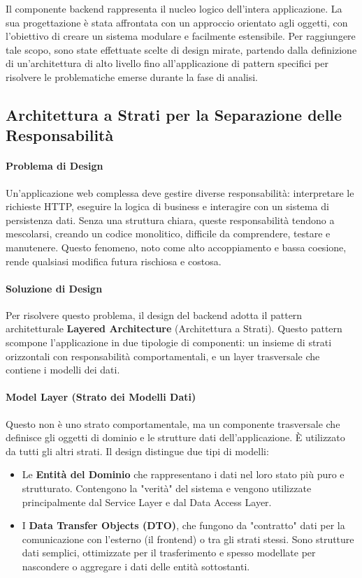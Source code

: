 \documentclass[12pt,a4paper,openright,twoside]{book}
\begin{document}
Il componente backend rappresenta il nucleo logico dell'intera applicazione. La sua progettazione è stata affrontata con un approccio orientato agli oggetti, con l'obiettivo di creare un sistema modulare e facilmente estensibile. Per raggiungere tale scopo, sono state effettuate scelte di design mirate, partendo dalla definizione di un'architettura di alto livello fino all'applicazione di pattern specifici per risolvere le problematiche emerse durante la fase di analisi.

\subsection{Architettura a Strati per la Separazione delle Responsabilità}
\label{subsec:design_layered}

\paragraph{Problema di Design}
Un'applicazione web complessa deve gestire diverse responsabilità: interpretare le richieste HTTP, eseguire la logica di business e interagire con un sistema di persistenza dati. Senza una struttura chiara, queste responsabilità tendono a mescolarsi, creando un codice monolitico, difficile da comprendere, testare e manutenere. Questo fenomeno, noto come alto accoppiamento e bassa coesione, rende qualsiasi modifica futura rischiosa e costosa.

\paragraph{Soluzione di Design}
Per risolvere questo problema, il design del backend adotta il pattern architetturale \textbf{Layered Architecture} (Architettura a Strati). Questo pattern scompone l'applicazione in due tipologie di componenti: un insieme di strati orizzontali con responsabilità comportamentali, e un layer trasversale che contiene i modelli dei dati.

\paragraph{Model Layer (Strato dei Modelli Dati)}
Questo non è uno strato comportamentale, ma un componente trasversale che definisce gli oggetti di dominio e le strutture dati dell'applicazione. È utilizzato da tutti gli altri strati. Il design distingue due tipi di modelli:
\begin{itemize}
    \item Le \textbf{Entità del Dominio} che rappresentano i dati nel loro stato più puro e strutturato. Contengono la "verità" del sistema e vengono utilizzate principalmente dal Service Layer e dal Data Access Layer.
    \item I \textbf{Data Transfer Objects (DTO)}, che fungono da "contratto" dati per la comunicazione con l'esterno (il frontend) o tra gli strati stessi. Sono strutture dati semplici, ottimizzate per il trasferimento e spesso modellate per nascondere o aggregare i dati delle entità sottostanti.
\end{itemize}
\end{document}
